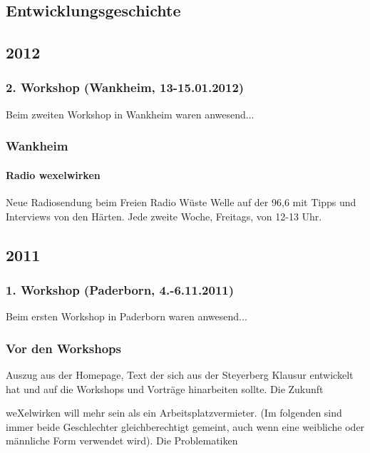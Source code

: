 \begin{appendix}

\chapter{Entwicklungsgeschichte}
  \section{2012}
    \subsection{2. Workshop (Wankheim, 13-15.01.2012)}
Beim zweiten Workshop in Wankheim waren anwesend...
    \subsection{Wankheim}
      \subsubsection{Radio wexelwirken}
Neue Radiosendung beim Freien Radio Wüste Welle auf der 96,6 mit Tipps und Interviews von den Härten. Jede zweite Woche, Freitags, von 12-13 Uhr.
  \section{2011}
    \subsection{1. Workshop (Paderborn, 4.-6.11.2011)}
Beim ersten Workshop in Paderborn waren anwesend...
    \subsection{Vor den Workshops}
Auszug aus der Homepage, Text der sich aus der Steyerberg Klausur entwickelt hat und auf die Workshops und Vorträge hinarbeiten sollte.
\glqq 
Die Zukunft

weXelwirken will mehr sein als ein Arbeitsplatzvermieter. (Im folgenden sind immer beide Geschlechter gleichberechtigt gemeint, auch wenn eine weibliche oder männliche Form verwendet wird).
Die Problematiken


\end{appendix}

